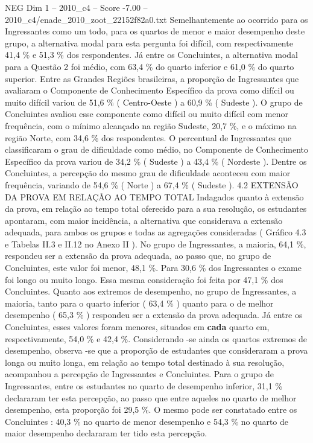 \begin{textsample}{NEG Dim 1 – 2010\_c4 – Score -7.00 – 2010\_c4/enade\_2010\_zoot\_22152f82a0.txt}
Semelhantemente ao ocorrido para os Ingressantes como um todo, para os quartos de menor e maior desempenho deste grupo, a alternativa modal para esta pergunta foi difícil, com respectivamente 41,4 \% e 51,3 \% dos respondentes.
Já entre os Concluintes, a alternativa modal para a Questão 2 foi médio, com 63,4 \% do quarto inferior e 61,0 \% do quarto superior.
Entre as Grandes Regiões brasileiras, a proporção de Ingressantes que avaliaram o Componente de Conhecimento Específico da prova como difícil ou muito difícil variou de 51,6 \% ( Centro-Oeste ) a 60,9 \% ( Sudeste ).
O grupo de Concluintes avaliou esse componente como difícil ou muito difícil com menor frequência, com o mínimo alcançado na região Sudeste, 20,7 \%, e o máximo na região Norte, com 34,6 \% dos respondentes.
O percentual de Ingressantes que classificaram o grau de dificuldade como médio, no Componente de Conhecimento Específico da prova variou de 34,2 \% ( Sudeste ) a 43,4 \% ( Nordeste ).
Dentre os Concluintes, a percepção do mesmo grau de dificuldade aconteceu com maior frequência, variando de 54,6 \% ( Norte ) a 67,4 \% ( Sudeste ). 4.2 EXTENSÃO DA PROVA EM RELAÇÃO AO TEMPO TOTAL Indagados quanto à extensão da prova, em relação ao tempo total oferecido para a sua resolução, os estudantes apontaram, com maior incidência, a alternativa que considerava a extensão adequada, para ambos os grupos e todas as agregações consideradas ( Gráfico 4.3 e Tabelas II.3 e II.12 no Anexo II ).
No grupo de Ingressantes, a maioria, 64,1 \%, respondeu ser a extensão da prova adequada, ao passo que, no grupo de Concluintes, este valor foi menor, 48,1 \%.
Para 30,6 \% dos Ingressantes o exame foi longo ou muito longo.
Essa mesma consideração foi feita por 47,1 \% dos Concluintes.
Quanto aos extremos de desempenho, no grupo de Ingressantes, a maioria, tanto para o quarto inferior ( 63,4 \% ) quanto para o de melhor desempenho ( 65,3 \% ) respondeu ser a extensão da prova adequada.
Já entre os Concluintes, esses valores foram menores, situados em \textbf{cada} quarto em, respectivamente, 54,0 \% e 42,4 \%.
Considerando -se ainda os quartos extremos de desempenho, observa -se que a proporção de estudantes que consideraram a prova longa ou muito longa, em relação ao tempo total destinado à sua resolução, acompanhou a percepção de Ingressantes e Concluintes.
Para o grupo de Ingressantes, entre os estudantes no quarto de desempenho inferior, 31,1 \% declararam ter esta percepção, ao passo que entre aqueles no quarto de melhor desempenho, esta proporção foi 29,5 \%.
O mesmo pode ser constatado entre os Concluintes : 40,3 \% no quarto de menor desempenho e 54,3 \% no quarto de maior desempenho declararam ter tido esta percepção.

\end{textsample}
